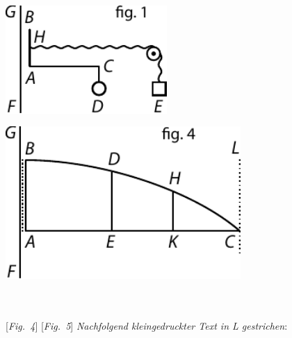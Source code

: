  \vspace{1.5em} 
\pstart
\hspace{3mm}
\begin{minipage}[t]{0.5\textwidth}
\includegraphics[width=0.46\textwidth]{gesamttex/edit_VIII,3/images/LH_37_03_073-074_d04.pdf}
\end{minipage}
\begin{minipage}[t]{0.5\textwidth}
\includegraphics[width=0.67\textwidth]{gesamttex/edit_VIII,3/images/LH_37_03_073-074_d05.pdf}
\end{minipage}
\\
\\\label{LH_37_03_073v_Fig.4}\label{LH_37_03_073v_Fig.5}
\vspace{-0.3em}
\hspace*{19mm} [\textit{Fig.~4}]\hspace*{64mm} [\textit{Fig.~5}]%
\pend
\newpage%
\count{}
\count{}
\count{}
\pstart%
\noindent%
\lbrack\textit{Nachfolgend kleingedruckter Text in L gestrichen}:\rbrack\
